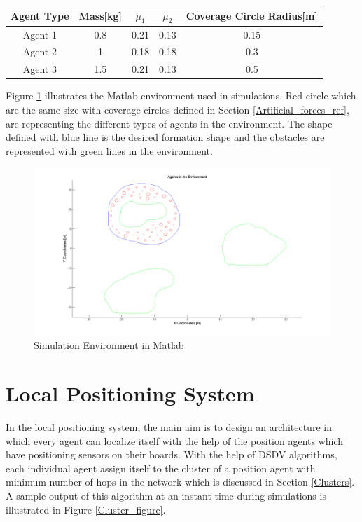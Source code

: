 \begin{center}
 \label{agent_props} 
\begin{tabular}{||c| c| c |c |c||}
				
\hline
\textbf{Agent Type} & \textbf{Mass[kg]}  & \textbf{$\mu_1$} & \textbf{$\mu_2$} & \textbf{Coverage Circle Radius[m]} \\ 
\hline
Agent 1& 0.8 & 0.21  & 0.13 & 0.15\\
Agent 2& 1   &  0.18 & 0.18 & 0.3\\	
Agent 3& 1.5 &  0.21 & 0.13 & 0.5\\	
\hline
\end{tabular}
\end{center}

Figure \ref{Matlab_env} illustrates the Matlab environment used in simulations. Red circle which are the same size with coverage circles defined in Section \ref{Artificial_forces_ref}, are representing the different types of agents in the environment. The shape defined with blue line is the desired formation shape and the obstacles are represented with green lines in the environment. 

\begin{figure}[H]
\caption{Simulation Environment in Matlab} \label{Matlab_env}
\centerline{\includegraphics[scale = 0.35]{2}}
\end{figure} 
    
\section{Local Positioning System} \label{lps_ref}
In the local positioning system, the main aim is to design an architecture in which every agent can localize itself with the help of the position agents which have positioning sensors on their boards. With the help of DSDV algorithms, each individual agent assign itself to the cluster of a position agent with minimum number of hops in the network which is discussed in Section \ref{Clusters}. A sample output of this algorithm at an instant time during simulations is illustrated in Figure \ref{Cluster_figure}. 
	
